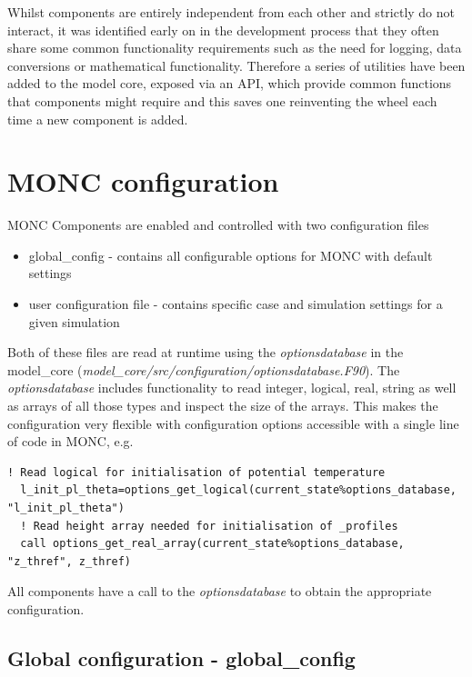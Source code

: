 \documentclass[a4paper,11pt]{article}
\begin{document}
Whilst components are entirely independent from each other and
strictly do not interact, it was identified early on in the development process
that they often share some common functionality requirements such as the need
for logging, data conversions or mathematical functionality. Therefore a series
of utilities have been added to the model core, exposed via an API, which
provide common functions that components might require and this saves one
reinventing the wheel each time a new component is added.

\section{MONC configuration}

MONC Components are enabled and controlled with two configuration files

\begin{itemize}
  \item {global\_config - contains all configurable options for MONC
  with default settings}
  \item {user configuration file - contains specific case and simulation settings
  for a given simulation}
\end{itemize}

Both of these files are read at runtime using the
\emph{optionsdatabase} in the model\_core \linebreak (\emph{model\_core/src/configuration/optionsdatabase.F90}).
The \emph{optionsdatabase} includes functionality to read integer, logical,
real, string as well as arrays of all those types and inspect the size of the
arrays. This makes the configuration very flexible with configuration options
accessible with a single line of code in MONC, e.g.
\begin{lstlisting}[caption={Example of code snippets from gridmanager to demonstrate how to read
  a logical from configuration}]
  ! Read logical for initialisation of potential temperature
  l_init_pl_theta=options_get_logical(current_state%options_database, "l_init_pl_theta")
  ! Read height array needed for initialisation of _profiles
  call options_get_real_array(current_state%options_database, "z_thref", z_thref)
\end{lstlisting}
All components have a call to the \emph{optionsdatabase} to obtain the appropriate
configuration.

\subsection{Global configuration - global\_config}
\end{document}
